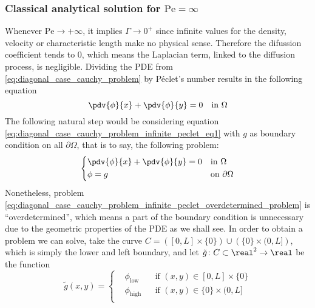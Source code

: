 \subsubsection{Classical analytical solution for \texorpdfstring{$\mathrm{Pe} =
\infty$}{infinite Péclet's number}}

Whenever $\mathrm{Pe} \to +\infty$, it implies $\Gamma \to 0^+$ since infinite
values for the density, velocity or characteristic length make no physical
sense. Therefore the difussion coefficient tends to $0$, which means the
Laplacian term, linked to the diffusion process, is negligible. Dividing the PDE
from \eqref{eq:diagonal_case_cauchy_problem} by Péclet's number results in the
following equation
\begin{equation} \label{eq:diagonal_case_cauchy_problem_infinite_peclet_eq1}
	\pdv{\phi}{x} + \pdv{\phi}{y} = 0 \quad \text{in } \Omega
\end{equation}
The following natural step would be considering equation
\eqref{eq:diagonal_case_cauchy_problem_infinite_peclet_eq1} with $g$ as boundary
condition on all $\partial \Omega$, that is to say, the following problem:
\begin{equation} \label{eq:diagonal_case_cauchy_problem_infinite_peclet_overdetermined_problem}
	\left\{
	\begin{aligned}
		&\pdv{\phi}{x} + \pdv{\phi}{y} = 0 &
		&\text{in } \Omega \\
		&\phi = g &
		&\text{on } \partial \Omega
	\end{aligned}
	\right.
\end{equation}
Nonetheless, problem
\eqref{eq:diagonal_case_cauchy_problem_infinite_peclet_overdetermined_problem}
is ``overdetermined'', which means a part of the boundary condition is
unnecessary due to the geometric properties of the PDE as we shall see. In order
to obtain a problem we can solve, take the curve $C = \left( [0,L] \times \{ 0
\} \right) \cup \left( \{ 0 \} \times (0,L] \right)$, which is simply the lower
and left boundary, and let $\tilde{g} \colon C \subset \real^2 \rightarrow
\real$ be the function
\begin{equation}
	\tilde{g}(x,y) = 
	\left\{
	\begin{aligned}
		&\phi_\text{low} 	& &\text{if } (x,y) \in [0,L] \times \{ 0 \} \\
		&\phi_\text{high} 	& &\text{if } (x,y) \in \{ 0 \} \times (0,L] \\
	\end{aligned}
	\right.
\end{equation}
